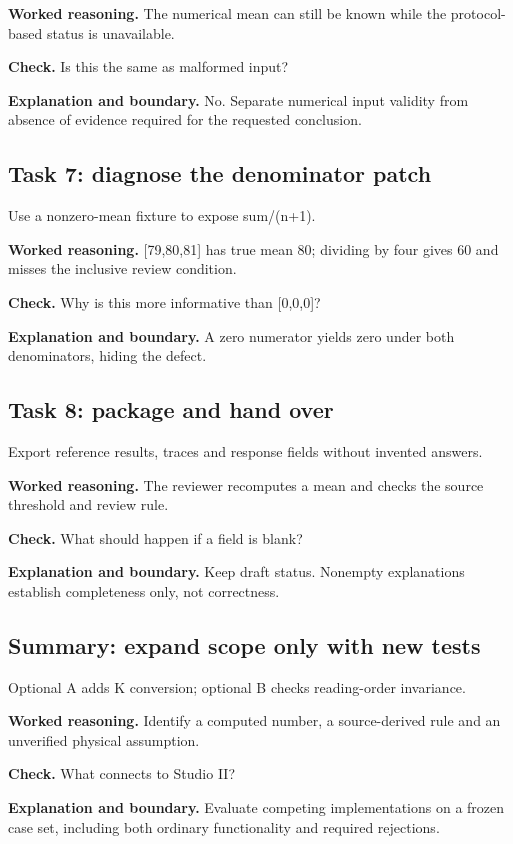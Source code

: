 \textbf{Worked reasoning.} The numerical mean can still be known while the protocol-based status is unavailable.

\textbf{Check.} Is this the same as malformed input?

\textbf{Explanation and boundary.} No. Separate numerical input validity from absence of evidence required for the requested conclusion.

\subsection{Task 7: diagnose the denominator patch}
Use a nonzero-mean fixture to expose sum/(n+1).

\textbf{Worked reasoning.} [79,80,81] has true mean 80; dividing by four gives 60 and misses the inclusive review condition.

\textbf{Check.} Why is this more informative than [0,0,0]?

\textbf{Explanation and boundary.} A zero numerator yields zero under both denominators, hiding the defect.

\subsection{Task 8: package and hand over}
Export reference results, traces and response fields without invented answers.

\textbf{Worked reasoning.} The reviewer recomputes a mean and checks the source threshold and review rule.

\textbf{Check.} What should happen if a field is blank?

\textbf{Explanation and boundary.} Keep draft status. Nonempty explanations establish completeness only, not correctness.

\subsection{Summary: expand scope only with new tests}
Optional A adds K conversion; optional B checks reading-order invariance.

\textbf{Worked reasoning.} Identify a computed number, a source-derived rule and an unverified physical assumption.

\textbf{Check.} What connects to Studio II?

\textbf{Explanation and boundary.} Evaluate competing implementations on a frozen case set, including both ordinary functionality and required rejections.

